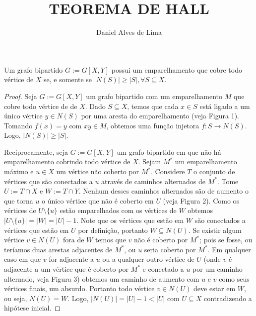 \documentclass[a4paper,12pt]{article}
\title{\textbf {TEOREMA DE HALL}}
\author[1]{Daniel Alves de Lima}
\date{}
\begin{document}
\maketitle

\begin{flushleft}

Um grafo bipartido $G := G[X,Y]$ possui um emparelhamento que cobre todo vértice de $X$ se, e somente se $|N(S)| \geq |S|, \forall S \subseteq X$.

\end{flushleft}

\begin{proof}

Seja $G := G[X,Y]$ um grafo bipartido com um emparelhamento $M$ que cobre todo vértice de de $X$. Dado $S \subseteq X$, temos que cada $x \in S$ está ligado a um único vértice $y \in N(S)$ por uma aresta do emparelhamento (veja Figura 1). Tomando $f(x) = y$ com $xy \in M$, obtemos uma função injetora $f : S \to N(S)$. Logo, $|N(S)| \geq |S|$. 

Reciprocamente, seja $G := G[X,Y]$ um grafo bipartido em que não há emparelhamento cobrindo todo vértice de $X$. Sejam $M^*$ um emparelhamento máximo e $u \in X$ um vértice não coberto por $M^*$. Considere $T$ o conjunto de vértices que são conectados a $u$ através de caminhos alternados de $M^*$. Tome $U := T \cap X$ e $W := T \cap Y$. Nenhum desses caminhos alternados são de aumento o que torna $u$ o único vértice que não é coberto em $U$ (veja Figura 2). Como os vértices de $U \setminus \{u\}$ estão emparelhados com os vértices de $W$ obtemos $|U \setminus \{u\}| = |W| = |U| - 1$. Note que os vértices que estão em $W$ são conectados a vértices que estão em $U$ por definição, portanto $W \subseteq N(U)$. Se existir algum vértice $v \in N(U)$ fora de $W$ temos que $v$ não é coberto por $M^*$; pois  se fosse, ou teríamos duas arestas adjacentes de $M^*$, ou $u$ seria coberto por $M^*$. Em qualquer caso em que $v$ for adjacente a $u$ ou a qualquer outro vértice de $U$ (onde $v$ é adjacente a um vértice que é coberto por $M^*$ e conectado a $u$ por um caminho alternado, veja Figura 3) obtemos um caminho de aumento com $u$ e $v$ como seus vértices finais, um absurdo. Portanto todo vértice $v \in N(U)$ deve estar em $W$, ou seja, $N(U) = W$. Logo, $|N(U)| = |U| - 1 < |U|$ com $U \subseteq X$ contradizendo a hipótese inicial.

\end{proof}
\end{document}
